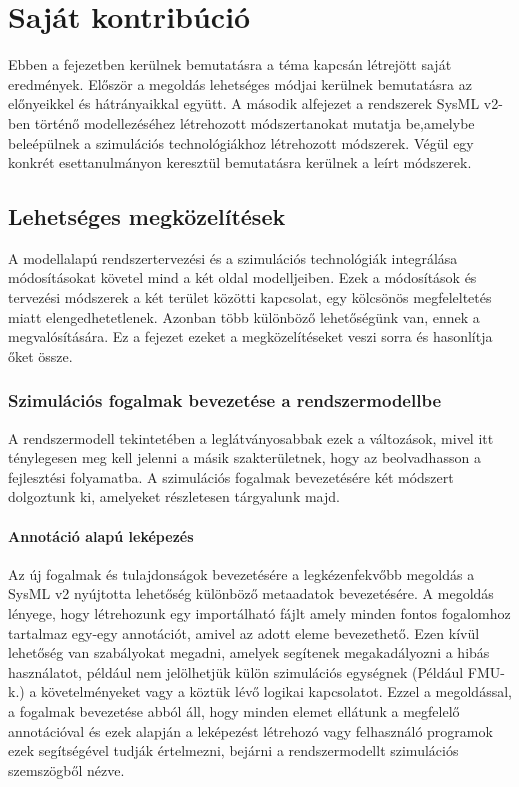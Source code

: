 \chapter{Saját kontribúció}
Ebben a fejezetben kerülnek bemutatásra a téma kapcsán létrejött saját eredmények. Először a megoldás lehetséges módjai kerülnek bemutatásra az előnyeikkel és hátrányaikkal együtt.
A második alfejezet a rendszerek SysML v2-ben történő modellezéséhez létrehozott módszertanokat mutatja be,amelybe beleépülnek a szimulációs technológiákhoz létrehozott módszerek.
Végül egy konkrét esettanulmányon keresztül bemutatásra kerülnek a leírt módszerek.

\section{Lehetséges megközelítések}
A modellalapú rendszertervezési és a szimulációs technológiák integrálása módosításokat követel mind a két oldal modelljeiben.
Ezek a módosítások és tervezési módszerek a két terület közötti kapcsolat, egy kölcsönös megfeleltetés miatt elengedhetetlenek.
Azonban több különböző lehetőségünk van, ennek a megvalósítására.
Ez a fejezet ezeket a megközelítéseket veszi sorra és hasonlítja őket össze.

    \subsection{Szimulációs fogalmak bevezetése a rendszermodellbe}
    A rendszermodell tekintetében a leglátványosabbak ezek a változások, mivel itt ténylegesen meg kell jelenni a másik szakterületnek, hogy az beolvadhasson a fejlesztési folyamatba.
    A szimulációs fogalmak bevezetésére két módszert dolgoztunk ki, amelyeket részletesen tárgyalunk majd.

        \subsubsection{Annotáció alapú leképezés}
        Az új fogalmak és tulajdonságok bevezetésére a legkézenfekvőbb megoldás a SysML v2 nyújtotta lehetőség különböző metaadatok bevezetésére.
        A megoldás lényege, hogy létrehozunk egy importálható fájlt amely minden fontos fogalomhoz tartalmaz egy-egy annotációt, amivel az adott eleme bevezethető.
        Ezen kívül lehetőség van szabályokat megadni, amelyek segítenek megakadályozni a hibás használatot, például nem jelölhetjük külön szimulációs egységnek (Például FMU-k.) a követelményeket vagy a köztük lévő logikai kapcsolatot.
        Ezzel a megoldással, a fogalmak bevezetése abból áll, hogy minden elemet ellátunk a megfelelő annotációval és ezek alapján a leképezést létrehozó vagy felhasználó programok ezek segítségével tudják értelmezni, bejárni a rendszermodellt szimulációs szemszögből nézve.

